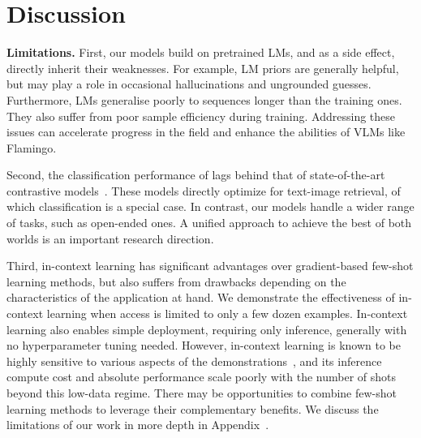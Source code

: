 \section{Discussion}

\label{sec:discussion}

\noindent
\textbf{Limitations.} First, our models build on pretrained LMs, and as a side effect, directly inherit their weaknesses.
For example, LM priors are generally helpful, but may play a role in occasional hallucinations and ungrounded guesses.
Furthermore, LMs generalise poorly to sequences longer than the training ones.
They also suffer from poor sample efficiency during training.
Addressing these issues can accelerate progress in the field and enhance the abilities of VLMs like Flamingo.

Second, the classification performance of \method{} lags behind that of state-of-the-art contrastive models~\citep{clip,pham2021combined}.
These models directly optimize for text-image retrieval, of which classification is a special case.
In contrast, our models handle a wider range of tasks, such as open-ended ones.
A unified approach to achieve the best of both worlds is an important research direction.

Third, in-context learning has significant advantages over gradient-based few-shot learning methods, but also suffers from drawbacks depending on the characteristics of the application at hand.
We demonstrate the effectiveness of in-context learning when access is limited to only a few dozen examples.
In-context learning also enables simple deployment, requiring only inference,
generally with no hyperparameter tuning needed.
However, in-context learning is known to be highly sensitive to various aspects of the demonstrations~\citep{zhao2021calibrate,truefewshot},
and its inference compute cost and absolute performance scale poorly with the number of shots beyond this low-data regime.
There may be opportunities to combine few-shot learning methods to leverage their complementary benefits.
We discuss the limitations of our work in more depth in Appendix~.


